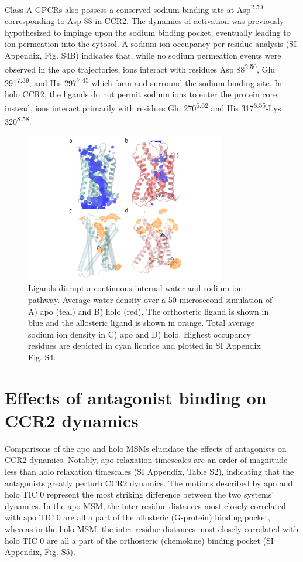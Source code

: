 \documentclass[9pt,twocolumn,twoside]{pnas-new}
\newcommand{\bwn}[2]{#1\textsuperscript{#2}}
\begin{document}
Class A GPCRs also possess a conserved sodium binding site at \bwn{Asp}{2.50} corresponding to Asp 88 in CCR2\cite{Katritch2014}.
The dynamics of activation was previously hypothesized to impinge upon the sodium binding pocket, eventually leading to ion permeation into the cytosol\cite{Vickery2018}.
A sodium ion occupancy per residue analysis (SI Appendix, Fig. S4B) indicates that, while no sodium permeation events were observed in the apo trajectories, ions interact with residues \bwn{Asp 88}{2.50}, \bwn{Glu 291}{7.39}, and \bwn{His 297}{7.45} which form and surround the sodium binding site.
In holo CCR2, the ligands do not permit sodium ions to enter the protein core; instead, ions interact primarily with residues Glu 270\textsuperscript{6.62} and His 317\textsuperscript{8.55}-Lys 320\textsuperscript{8.58}.

\begin{figure}[h]
\centering
\includegraphics[width=8.7cm]{water_na_internal.pdf}
\caption{Ligands disrupt a continuous internal water and sodium ion pathway. Average water density over a 50 microsecond simulation of A) apo (teal) and B) holo (red). The orthosteric ligand is shown in blue and the allosteric ligand is shown in orange. Total average sodium ion density in C) apo and D) holo. Highest occupancy residues are depicted in cyan licorice and plotted in SI Appendix Fig. S4.}
\label{fig:water_na}
\end{figure}

\section*{Effects of antagonist binding on CCR2 dynamics}

Comparisons of the apo and holo MSMs elucidate the effects of antagonists on CCR2 dynamics.
Notably, apo relaxation timescales are an order of magnitude less than holo relaxation timescales (SI Appendix, Table S2), indicating that the antagonists greatly perturb CCR2 dynamics.
The motions described by apo and holo TIC 0 represent the most striking difference between the two systems' dynamics.
In the apo MSM, the inter-residue distances most closely correlated with apo TIC 0 are all a part of the allosteric (G-protein) binding pocket, whereas in the holo MSM, the inter-residue distances most closely correlated with holo TIC 0 are all a part of the orthosteric (chemokine) binding pocket (SI Appendix, Fig. S5).
\end{document}
